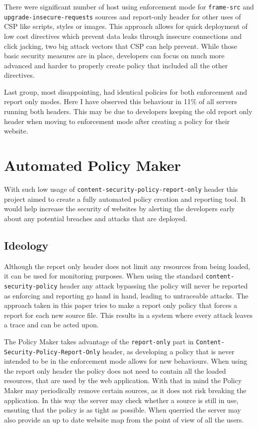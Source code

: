 \begin{description}
There were significant number of host using enforcement mode for \texttt{frame-src} and \texttt{upgrade-insecure-requests} sources and report-only header for other uses of CSP like scripts, styles or images.
This approach allows for quick deployment of low cost directives which prevent data leaks through insecure connections and click jacking, two big attack vectors that CSP can help prevent.
While those basic security measures are in place, developers can focus on much more advanced and harder to properly create policy that included all the other directives.

Last group, most disappointing, had identical policies for both enforcement and report only modes.
Here I have observed this behaviour in 11\% of all servers running both headers.
This may be due to developers keeping the old report only header when moving to enforcement mode after creating a policy for their website.

\section{Automated Policy Maker}

With such low usage of \texttt{content-security-policy-report-only} header this project aimed to create a fully automated policy creation and reporting tool.
It would help increase the security of websites by alerting the developers early about any potential breaches and attacks that are deployed.


\subsection{Ideology}

Although the report only header does not limit any resources from being loaded, it can be used for monitoring purposes.
When using the standard \texttt{content-security-policy} header any attack bypassing the policy will never be reported as enforcing and reporting go hand in hand, leading to untraceable attacks.
The approach taken in this paper tries to make a report only policy that forces a report for each new source file.
This results in a system where every attack leaves a trace and can be acted upon.

The Policy Maker takes advantage of the \texttt{report-only} part in \texttt{Content-Security-Policy-Report-Only} header, as developing a policy that is never intended to be in the enforcement mode allows for new behaviours.
When using the report only header the policy does not need to contain all the loaded resources, that are used by the web application.
With that in mind the Policy Maker may periodically remove certain sources, as it does not risk breaking the application.
In this way the server may check whether a source is still in use, ensuting that the policy is as tight as possible. 
When querried the server may also provide an up to date website map from the point of view of all the users.


\end{description}
